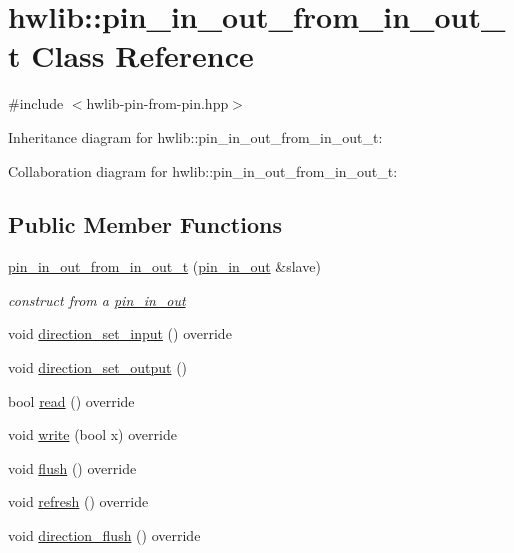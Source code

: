 \hypertarget{classhwlib_1_1pin__in__out__from__in__out__t}{}\section{hwlib\+:\+:pin\+\_\+in\+\_\+out\+\_\+from\+\_\+in\+\_\+out\+\_\+t Class Reference}
\label{classhwlib_1_1pin__in__out__from__in__out__t}


{\ttfamily \#include $<$hwlib-\/pin-\/from-\/pin.\+hpp$>$}



Inheritance diagram for hwlib\+:\+:pin\+\_\+in\+\_\+out\+\_\+from\+\_\+in\+\_\+out\+\_\+t\+:


Collaboration diagram for hwlib\+:\+:pin\+\_\+in\+\_\+out\+\_\+from\+\_\+in\+\_\+out\+\_\+t\+:
\subsection*{Public Member Functions}
\begin{DoxyCompactItemize}
\item 
\mbox{\label{classhwlib_1_1pin__in__out__from__in__out__t_a9000db9c9c808e12b8cae3f7c6fea75e}} 
\hyperlink{classhwlib_1_1pin__in__out__from__in__out__t_a9000db9c9c808e12b8cae3f7c6fea75e}{pin\+\_\+in\+\_\+out\+\_\+from\+\_\+in\+\_\+out\+\_\+t} (\hyperlink{classhwlib_1_1pin__in__out}{pin\+\_\+in\+\_\+out} \&slave)
\begin{DoxyCompactList}\small\item\em construct from a \hyperlink{classhwlib_1_1pin__in__out}{pin\+\_\+in\+\_\+out} \end{DoxyCompactList}\item 
void \hyperlink{classhwlib_1_1pin__in__out__from__in__out__t_a0b0a260c43a6f1162fd5bc6bbffeaa15}{direction\+\_\+set\+\_\+input} () override
\item 
void \hyperlink{classhwlib_1_1pin__in__out__from__in__out__t_a6c0f6e7f37e52cc1d6fec7932a024cb1}{direction\+\_\+set\+\_\+output} ()
\item 
bool \hyperlink{classhwlib_1_1pin__in__out__from__in__out__t_ae1a321c11a2691bb6068e18835add2de}{read} () override
\item 
void \hyperlink{classhwlib_1_1pin__in__out__from__in__out__t_a20e982d8706e7a45e5d622c54602c87e}{write} (bool x) override
\item 
void \hyperlink{classhwlib_1_1pin__in__out__from__in__out__t_a652dca78cb01191780f571b7f31e6e77}{flush} () override
\item 
void \hyperlink{classhwlib_1_1pin__in__out__from__in__out__t_a837f2e06d599ef26730a1e05c997d334}{refresh} () override
\item 
void \hyperlink{classhwlib_1_1pin__in__out__from__in__out__t_a68d7cb2826dbd2d36d4641e0b1d91c81}{direction\+\_\+flush} () override
\end{DoxyCompactItemize}


